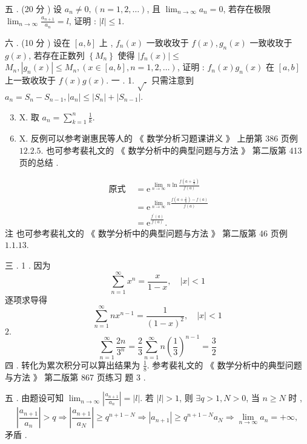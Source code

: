 \documentclass[10pt]{article}
\begin{document}
 五 . (20  分 )  设  $a_{n} \neq 0,(n=1,2, \ldots)$,  且  $\lim _{n \rightarrow \infty} a_{n}=0$,  若存在极限  $\lim _{n \rightarrow \infty} \frac{a_{n+1}}{a_{n}}=l$,  证明 : $|l| \leqslant 1$.

 六 . (10  分 )  设在  $[a, b]$  上 , $f_{n}(x)$  一致收玫于  $f(x), g_{n}(x)$  一致收玫于  $g(x)$,  若存在正数列  $\left\{M_{n}\right\}$  使得  $\left|f_{n}(x)\right| \leqslant$ $M_{n},\left|g_{n}(x)\right| \leqslant M_{n},(x \in[a, b], n=1,2, \ldots)$,  证明 : $f_{n}(x) g_{n}(x)$  在  $[a, b]$  上一致收玫于  $f(x) g(x)$.  一 . 1. $\sqrt{.}$  只需注意到  $a_{n}=S_{n}-S_{n-1},\left|a_{n}\right| \leqslant\left|S_{n}\right|+\left|S_{n-1}\right|$.

\begin{enumerate}
  \setcounter{enumi}{2}
  \item X.  取  $a_{n}=\sum_{k=1}^{n} \frac{1}{k}$.
\end{enumerate}


\begin{enumerate}
  \setcounter{enumi}{5}
  \item X.  反例可以参考谢惠民等人的 《 数学分析习题课讲义 》 上册第  386  页例  $12.2 .5$.  也可参考裴礼文的  《 数学分析中的典型问题与方法 》 第二版第  413  页的总结 .
\end{enumerate}
$$
\begin{aligned}
\text { 原式 } &=\mathrm{e}^{\lim _{n \rightarrow \infty} n \ln \frac{f\left(a+\frac{1}{n}\right)}{f(a)}} \\
&=\mathrm{e}^{\lim _{n \rightarrow \infty} n \frac{f\left(a+\frac{1}{n}\right)-f(a)}{f(a)}} \\
&=\mathrm{e}^{\frac{f^{\prime}(a)}{f(a)}} .
\end{aligned}
$$
 注   也可参考裴礼文的 《 数学分析中的典型问题与方法 》 第二版第  46  页例  $1.1 .13$.

 三 . 1 .  因为 
$$
\sum_{n=1}^{\infty} x^{n}=\frac{x}{1-x}, \quad|x|<1
$$
 逐项求导得 
$$
\sum_{n=1}^{\infty} n x^{n-1}=\frac{1}{(1-x)^{2}}, \quad|x|<1
$$
$2 .$
$$
\sum_{n=1}^{\infty} \frac{2 n}{3^{n}}=\frac{2}{3} \sum_{n=1}^{\infty} n\left(\frac{1}{3}\right)^{n-1}=\frac{3}{2}
$$
 四 .  转化为累次积分可以算出结果为  $\frac{1}{8}$.  参考裴礼文的 《 数学分析中的典型问题与方法 》 第二版第  867  页练习   题  3 .

 五 .  由题设可知  $\lim _{n \rightarrow \infty}\left|\frac{a_{n+1}}{a_{n}}\right|=|l|$.  若  $|l|>1$,  则  $\exists q>1, N>0$,  当  $n \geqslant N$  时 ,
$$
\left|\frac{a_{n+1}}{a_{n}}\right|>q \Longrightarrow\left|\frac{a_{n+1}}{a_{N}}\right| \geqslant q^{n+1-N} \Longrightarrow\left|a_{n+1}\right| \geqslant q^{n+1-N} a_{N} \Longrightarrow \lim _{n \rightarrow \infty} a_{n}=+\infty,
$$
 矛盾 .
\end{document}
